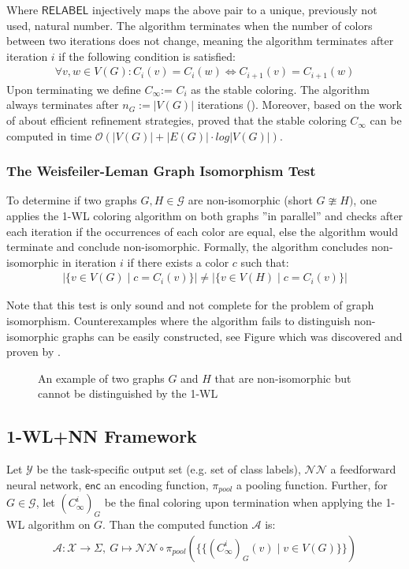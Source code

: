 \documentclass[11pt, dvipsnames, DIV=12]{scrreprt}
\theoremstyle{definition}
\newcommand{\MSopen}{\{\!\!\{}
\newcommand{\MSclose}{\}\!\!\}}
\begin{document}
\noindent Where $\textsf{RELABEL}$ injectively maps the above pair to a unique, previously not used, natural number. The algorithm terminates when the number of colors between two iterations does not change, meaning the algorithm terminates after iteration $i$ if the following condition is satisfied:
\begin{align}
\forall v,w \in V(G):  C_i(v) = C_i(w) \iff C_{i+1}(v) = C_{i+1}(w)
\end{align}
Upon terminating we define $C_{\infty}$:= $C_i$ as the stable coloring. The algorithm always terminates after $n_G:= |V(G)|$ iterations (\cite{Gro2017}). Moreover, based on the work of \cite{Pai+87} about efficient refinement strategies, \cite{Car+82} proved that the stable coloring $C_\infty$ can be computed in time $\mathcal{O}(| V(G) | + |E(G)| \cdot log | V(G) |)$.

\subsubsection{The Weisfeiler-Leman Graph Isomorphism Test}
To determine if two graphs $G, H \in \mathcal{G}$ are non-isomorphic (short $G \ncong H)$, one applies the 1-WL coloring algorithm on both graphs ''in parallel'' and checks after each iteration if the occurrences of each color are equal, else the algorithm would terminate and conclude non-isomorphic. Formally, the algorithm concludes non-isomorphic in iteration $i$ if there exists a color $c$ such that: 
\begin{align}
    |\{ v \in V(G) \mid c = C_i(v)\} | \neq |\{ v \in V(H) \mid c = C_i(v)\} |
\end{align}

Note that this test is only sound and not complete for the problem of graph isomorphism. Counterexamples where the algorithm fails to distinguish non-isomorphic graphs can be easily constructed, see Figure  which was discovered and proven by \cite{Cai1992}.

\begin{figure}[H]
    \centering
    
    \caption{An example of two graphs $G$ and $H$ that are non-isomorphic but cannot be distinguished by the 1-WL}
    \label{1-WL Counter Example}
\end{figure}

\subsection{1-WL+NN Framework}\label{sec:1-WL+NN Definition}
Let $\mathcal{Y}$ be the task-specific output set (e.g. set of class labels), $\mathcal{NN}$ a feedforward neural network, $\textsf{enc}$ an encoding function, $\pi_{pool}$ a pooling function. Further, for $G \in \mathcal{G}$, let $(C^i_\infty)_{G}$ be the final coloring upon termination when applying the 1-WL algorithm on $G$. Than the computed function $\mathcal{A}$ is:
\begin{align}
\mathcal{A}: \mathcal{X} \rightarrow \Sigma, \  G \mapsto \mathcal{NN} \circ \pi_{pool}(\MSopen (C^i_\infty)_{G}(v) \mid v \in V(G) \MSclose)
\end{align}
\end{document}
